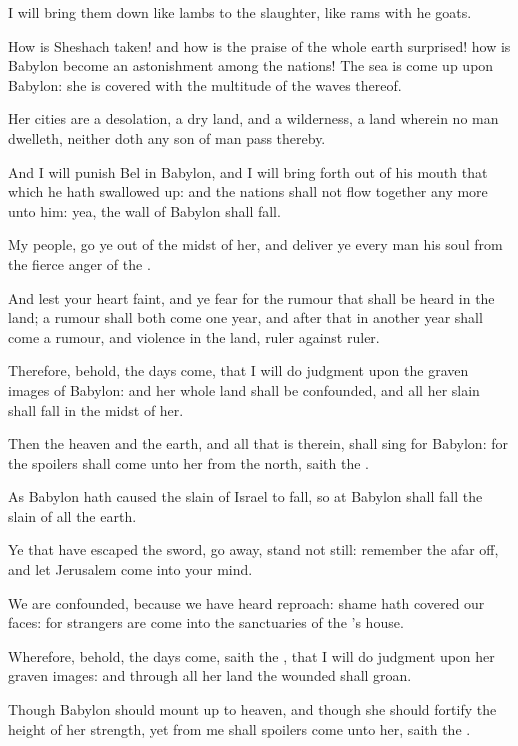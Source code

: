 \verse I will bring them down like lambs to the slaughter, like rams with he goats.

\verse How is Sheshach taken! and how is the praise of the whole earth surprised! how is Babylon become an astonishment among the nations!  \verse The sea is come up upon Babylon: she is covered with the multitude of the waves thereof.

\verse Her cities are a desolation, a dry land, and a wilderness, a land wherein no man dwelleth, neither doth any son of man pass thereby.

\verse And I will punish Bel in Babylon, and I will bring forth out of his mouth that which he hath swallowed up: and the nations shall not flow together any more unto him: yea, the wall of Babylon shall fall.

\verse My people, go ye out of the midst of her, and deliver ye every man his soul from the fierce anger of the \LORD.

\verse And lest your heart faint, and ye fear for the rumour that shall be heard in the land; a rumour shall both come one year, and after that in another year shall come a rumour, and violence in the land, ruler against ruler.

\verse Therefore, behold, the days come, that I will do judgment upon the graven images of Babylon: and her whole land shall be confounded, and all her slain shall fall in the midst of her.

\verse Then the heaven and the earth, and all that is therein, shall sing for Babylon: for the spoilers shall come unto her from the north, saith the \LORD.

\verse As Babylon hath caused the slain of Israel to fall, so at Babylon shall fall the slain of all the earth.

\verse Ye that have escaped the sword, go away, stand not still: remember the \LORD afar off, and let Jerusalem come into your mind.

\verse We are confounded, because we have heard reproach: shame hath covered our faces: for strangers are come into the sanctuaries of the \LORD's house.

\verse Wherefore, behold, the days come, saith the \LORD, that I will do judgment upon her graven images: and through all her land the wounded shall groan.

\verse Though Babylon should mount up to heaven, and though she should fortify the height of her strength, yet from me shall spoilers come unto her, saith the \LORD.

